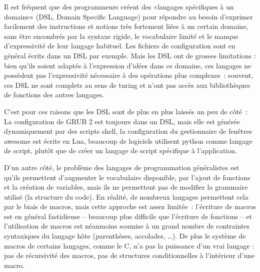 \documentclass{article}
\begin{document}
Il est fréquent que des programmeurs créent des «langages spécifiques à un domaine» (DSL, Domain Specific Language) pour répondre au besoin
d'exprimer facilement des instructions et notions très fortement liées à un certain domaine, sans être encombrés par la syntaxe rigide, le
vocabulaire limité et le manque d'expressivité de leur langage habituel. Les fichiers de configuration sont en général écrits dans un DSL
par exemple. Mais les DSL ont de grosses limitations : bien qu'ils soient adaptés à l'expression d'idées dans ce domaine, ces langages ne
possèdent pas l'expressivité nécessaire à des opérations plus complexes~: souvent, ces DSL ne sont complets au sens de turing et n'ont pas
accès aux bibliothèques de fonctions des autres langages.

C'est pour ces raisons que les DSL sont de plus en plus laissés un peu de côté~: La configuration de GRUB 2 est toujours dans un DSL, mais
elle est générée dynamiquement par des scripts shell\cite{config-grub}, la configuration du gestionnaire de fenêtres awesome est écrite en
Lua\cite{config-awesome}, beaucoup de logiciels utilisent python comme langage de script, plutôt que de créer un langage de script
spécifique à l'application.

D'un autre côté, le problème des langages de programmation généralistes est qu'ils permettent d'augmenter le vocabulaire disponible, par
l'ajout de fonctions et la création de variables, mais ils ne permettent pas de modifier la grammaire utilisé (la structure du code). En
réalité, de nombreux langages permettent cela par le biais de macros, mais cette approche est assez limitée~: l'écriture de macros est en
général fastidieuse -- beaucoup plus difficile que l'écriture de fonctions -- et l'utilisation de macros est néanmoins soumise à un grand
nombre de contraintes syntaxiques du langage hôte (parenthèses, accolades, \dots). De plus le système de macros de certains langages, comme
le C, n'a pas la puissance d'un vrai langage : pas de récursivité des macros, pas de structures conditionnelles à l'intérieur d'une macro.
\end{document}
